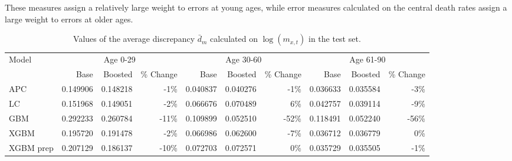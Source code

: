 \documentclass[fleqn,10pt]{wlscirep}
\begin{document}
These measures assign a relatively large weight to errors at young ages, while error measures calculated on the central death rates assign a large weight to errors at older ages.
\color{black} 
%
\begin{table}[ht]
\centering
\footnotesize
\begin{tabular}{|l|r|r|r|r|r|r|r|r|r|}
\hline
\multirow{2}{*}{Model} & \multicolumn{3}{c|}{Age 0-29} & \multicolumn{3}{c|}{Age 30-60} & \multicolumn{3}{c|}{Age 61-90} \\
\cline{2-10}
			&	Base 	&	Boosted 	& \% Change &	Base 	&	Boosted 	& \% Change &	Base 	&	Boosted	& \% Change\\
\hline
APC 			&	0.149906	&	0.148218	&	-1\%		&	0.040837	&	0.040276		&	-1\%		&	0.036633	&	0.035584	&	-3\%	\\
LC 			&	0.151968	&	0.149051	&	-2\%		&	0.066676	&	0.070489		&	6\%		&	0.042757	&	0.039114	&	-9\%	\\
GBM 		&	0.292233	&	0.260784	&	-11\%	&	0.109899	&	0.052510		&	-52\%	&	0.118491	&	0.052240	&	-56\% \\
XGBM 		&	0.195720	&	0.191478	&	-2\%		&	0.066986	&	0.062600		&	-7\%		&	0.036712	&	0.036779	&	0\%	\\
XGBM prep 	&	0.207129	&	0.186137	&	-10\%	&	0.072703	&	0.072571		&	0\%		&	0.035729	&	0.035505	&	-1\%	\\
\hline
\end{tabular}
\caption{Values of the average discrepancy $\bar{d}_m$ calculated on $\log{\left(m_{x,t}\right)}$ in the test set.}
\label{tab:avecri_log}
\end{table}\\
%
\end{document}
